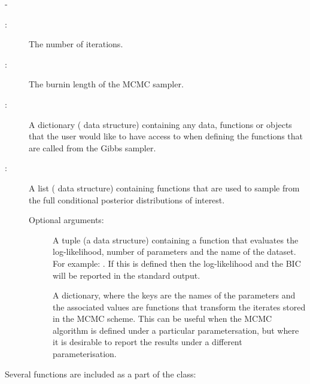 -\documentclass[article]{jss}
\begin{document}
\begin{description}
\item[:]  The number of iterations. 
\item[:]  The burnin length of the MCMC sampler. 
\item[:] A dictionary ( data structure)
  containing any data, functions or objects that the user would like
  to have access to when defining the functions that are called from
  the Gibbs sampler.
\item[:] A list ( data structure)
  containing functions that are used to sample from the full
  conditional posterior distributions of interest.
\item[] Optional arguments:
  
  \begin{description}
  \item[] A tuple (a  data structure)
    containing a function that evaluates the log-likelihood, number of
    parameters and the name of the dataset. For example: .  If this is defined then the
    log-likelihood and the BIC will be reported in the standard
    output.
  \item[] A dictionary, where the keys are the names
    of the parameters and the associated values are functions that
    transform the iterates stored in the MCMC scheme. This can be
    useful when the MCMC algorithm is defined under a particular
    parametersation, but where it is desirable to report the results
    under a different parameterisation.
  \end{description}
\end{description}
Several functions are included as a part of the class:
\end{document}
